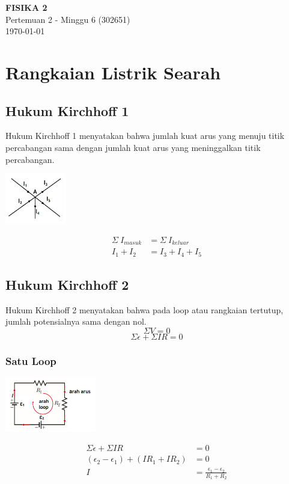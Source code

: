 \documentclass[twocolumn, 11pt]{article}%
\begin{document}
\begin{strip}
  \vspace*{\dimexpr-\stripsep}
  \begin{center}
      \Large\textbf{FISIKA 2}\\
      \large{Pertemuan 2 - Minggu 6 (302651)}\\
      \large{\today}
   \end{center}
\end{strip}

\section{Rangkaian Listrik Searah}
\subsection{Hukum Kirchhoff 1}%
    Hukum Kirchhoff 1 menyatakan bahwa jumlah kuat arus yang menuju titik percabangan sama dengan jumlah kuat arus yang meninggalkan titik percabangan.
    \begin{center}
    \includegraphics[width=100px]{1.png}
    \end{center}
    \begin{align*}
        \Sigma\ I_{masuk} &= \Sigma\ I_{keluar}\\
        I_1 + I_2 &= I_3 + I_4 + I_5
    \end{align*}
\subsection{Hukum Kirchhoff 2}%
    Hukum Kirchhoff 2 menyatakan bahwa pada loop atau rangkaian tertutup, jumlah potensialnya sama dengan nol.
    \[ \Sigma V=0 \]
    \[\Sigma \epsilon + \Sigma IR=0 \]
    \subsubsection{Satu Loop}%
    \begin{center}
        \includegraphics[width=150px]{2.png}
    \end{center}
    \begin{align*}
        \Sigma\epsilon+\Sigma IR&=0\\
        (\epsilon_2-\epsilon_1)+(IR_1+IR_2)&=0\\
        I&=\frac{\epsilon_1-\epsilon_2}{R_1 + R_2}
    \end{align*}
\end{document}
